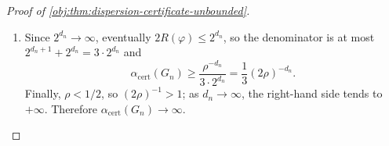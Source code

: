 \begin{proof}[Proof of \cref{obj:thm:dispersion-certificate-unbounded}]
\begin{enumerate}
\item Since \(2^{d_n}\to\infty\), eventually
\(2R(\varphi)\leq2^{d_n}\), so the denominator is at most \(2^{d_n+1}+2^{d_n}=3\cdot2^{d_n}\) and
\[
\alpha_{\mathrm{cert}}(G_n)\geq
\frac{\rho^{-d_n}}{3\cdot2^{d_n}}
=\frac13(2\rho)^{-d_n}.
\]
Finally, \(\rho<1/2\), so \((2\rho)^{-1}>1\); as \(d_n\to\infty\), the
right-hand side tends to \(+\infty\).  Therefore
\(\alpha_{\mathrm{cert}}(G_n)\to\infty\).
\end{enumerate}
\end{proof}
